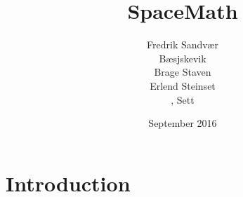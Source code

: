 \documentclass{article}
\title{SpaceMath}
\author{
  Fredrik Sandvær\\
  Bæsjskevik\\
  Brage Staven\\
  Erlend Steinset\\, Sett
}
\date{September 2016}
\begin{document}
\maketitle

\section{Introduction}
\end{document}
